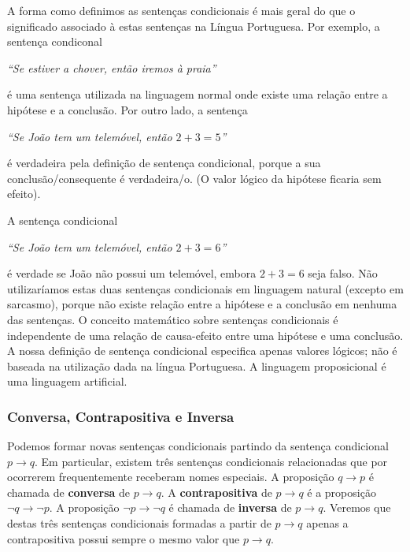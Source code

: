 A forma como definimos as sentenças condicionais é mais geral do que o
significado associado à estas sentenças na Língua Portuguesa. Por exemplo, a
sentença condiconal
\begin{center}\emph{``Se estiver a chover, então iremos à praia''}\end{center}

é uma sentença utilizada na linguagem normal onde existe uma relação entre a
hipótese e a conclusão. Por outro lado, a sentença

\begin{center}\emph{``Se João tem um telemóvel, então $2+3=5$''}\end{center}

é verdadeira pela definição de sentença condicional, porque a sua
conclusão/consequente é verdadeira/o. (O valor lógico da hipótese ficaria sem
efeito). 

A sentença condicional

\begin{center}\emph{``Se João tem um telemóvel, então $2+3=6$''}\end{center}

é verdade se João não possui um telemóvel, embora $2+3=6$ seja falso. Não
utilizaríamos estas duas sentenças condicionais em linguagem natural (excepto
em sarcasmo), porque não existe relação entre a hipótese e a conclusão em
nenhuma das sentenças. O conceito matemático sobre sentenças condicionais é
independente de uma relação de causa-efeito entre uma hipótese e uma conclusão.
A nossa definição de sentença condicional especifica apenas valores lógicos; não
é baseada na utilização dada na língua Portuguesa. A linguagem proposicional é
uma linguagem artificial.

\subsubsection*{Conversa, Contrapositiva e Inversa}

Podemos formar novas sentenças condicionais partindo da sentença condicional $p
\to q$. Em particular, existem três sentenças condicionais relacionadas que
por ocorrerem frequentemente receberam nomes especiais. A proposição $q \to
p$ é chamada de \textbf{conversa} de $p \to q$. A \textbf{contrapositiva} de $p \to q$ é a
proposição $\lnot q \to \lnot p$. A proposição $\lnot p \to \lnot q$ é chamada
de \textbf{inversa} de $p \to q$. Veremos que destas três sentenças condicionais
formadas a partir de $p \to q$ apenas a contrapositiva possui sempre o mesmo
valor que $p \to q$.

